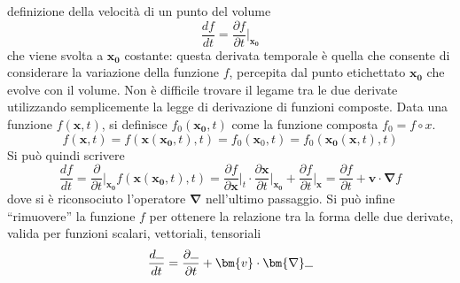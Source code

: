  definizione della velocità di un punto del volume
 \begin{equation}
  \dfrac{d f}{d t} = \dfrac{\partial f}{\partial t}\bigg|_{\bm{x_0}}
 \end{equation}
che viene svolta a $\bm{x_0}$ costante: questa derivata temporale è quella che consente di considerare la variazione
 della funzione $f$, percepita dal punto etichettato $\bm{x_0}$ che evolve con il volume.
%
Non è difficile trovare il legame tra le due derivate utilizzando semplicemente la legge di derivazione di funzioni composte.
Data una funzione $f(\bm{x},t)$, si definisce $f_0(\bm{x_0},t)$ come la funzione composta $f_0 = f \circ x$.
\begin{equation}
 f(\bm{x},t) = f(\bm{x}(\bm{x_0},t),t) = f_0(\bm{x}_0,t) = f_0(\bm{x_0}(\bm{x},t),t)
\end{equation}
Si può quindi scrivere
\begin{equation}
 \dfrac{d f}{d t} = \dfrac{\partial}{\partial t}\bigg|_{\bm{x_0}} f(\bm{x}(\bm{x_0},t),t) = 
  \dfrac{\partial f}{\partial \bm{x}}\bigg|_{t} \cdot \dfrac{\partial \bm{x}}{\partial t}\bigg|_{\bm{x_0}} 
  + \dfrac{\partial f}{\partial t}\bigg|_{\bm{x}} = 
  \dfrac{\partial f}{\partial t} + \bm{v} \cdot \bm{\nabla} f  
\end{equation}
dove si è riconsociuto l'operatore $\bm{\nabla}$ nell'ultimo passaggio. Si può infine ``rimuovere'' la funzione $f$
 per ottenere la relazione tra la forma delle due derivate, valida per funzioni scalari, vettoriali, tensoriali
\begin{equation}
 \dfrac{d \rule{1.5ex}{.4pt}}{d t} = \dfrac{\partial \rule{1.5ex}{.4pt}}{\partial t} + \bm{v} \cdot \bm{\nabla} \rule{1.5ex}{.4pt}
\end{equation}


